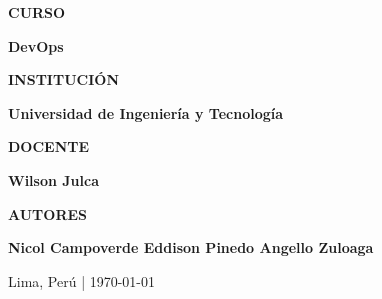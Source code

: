 \begin{titlepage}
\begin{minipage}{0.82\textwidth}
    {\color{cyan!30!white}
        \fontsize{8}{10}\selectfont
        \bfseries
        CURSO
    }\par

    \vspace{1mm}

    {\color{white}
        \fontsize{12}{15}\selectfont
        \bfseries
        DevOps
    }

    \vspace{6mm}

    {\color{cyan!30!white}
        \fontsize{8}{10}\selectfont
        \bfseries
        INSTITUCIÓN
    }\par

    \vspace{1mm}

    {\color{white}
        \fontsize{12}{15}\selectfont
        \bfseries
        Universidad de Ingeniería y Tecnología
    }

    \vspace{6mm}

    {\color{cyan!30!white}
        \fontsize{8}{10}\selectfont
        \bfseries
        DOCENTE
    }\par

    \vspace{1mm}

    {\color{white}
        \fontsize{12}{15}\selectfont
        \bfseries
        Wilson Julca
    }

\end{minipage}


\vfill

\begin{minipage}{0.82\textwidth}
    \sffamily

    {\color{cyan!30!white}
        \fontsize{8}{10}\selectfont
        \bfseries
        AUTORES
    }\par

    \vspace{2mm}

    {\color{white}
        \fontsize{11}{14}\selectfont
        \bfseries
        Nicol Campoverde
        \quad
        Eddison Pinedo
        \quad
        Angello Zuloaga
    }

    \vspace{5mm}

    {\color{white!80!cyan}
        \fontsize{9}{11}\selectfont
        Lima, Perú
        \quad | \quad
        \today
    }

\end{minipage}

\vspace*{14mm}

\end{titlepage}
